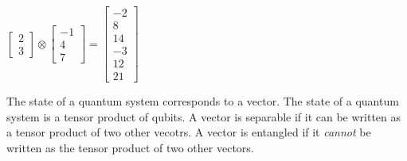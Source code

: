 \begin{example}
    $
    \begin{bmatrix}
        2\\
        3
    \end{bmatrix}
    \otimes
    \begin{bmatrix}
        -1\\
        4\\
        7
    \end{bmatrix}
    =
    \begin{bmatrix}
        -2\\
        8\\
        14\\
        -3\\
        12\\
        21
    \end{bmatrix}
    $
\end{example}

The state of a quantum system corresponds to a vector.
The state of a quantum system is a tensor product of qubits.
A vector is separable if it can be written as a tensor product of two other vecotrs.
A vector is entangled if it \emph{cannot} be written as the tensor product of two other vectors.


